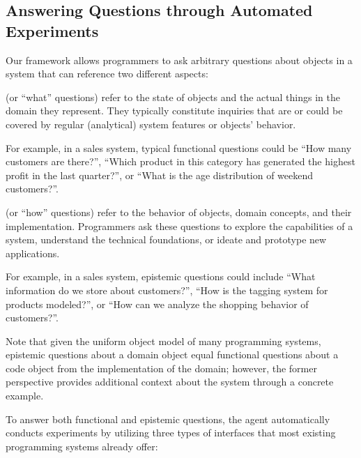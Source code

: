 \subsection*{Answering Questions through Automated Experiments}

Our framework allows programmers to ask arbitrary questions about objects in a system that can reference two different aspects:

\begin{description}[noextralabelsep]
	\item[Functional questions] (or ``what'' questions) refer to the state of objects and the actual things in the domain they represent.
	They typically constitute inquiries that are or could be covered by regular (analytical) system features or objects' behavior.

	For example, in a sales system, typical functional questions could be ``How many customers are there?'', ``Which product in this category has generated the highest profit in the last quarter?'', or ``What is the age distribution of weekend customers?''.

	\item[Epistemic questions] (or ``how'' questions) refer to the behavior of objects, domain concepts, and their implementation.
	Programmers ask these questions to explore the capabilities of a system, understand the technical foundations, or ideate and prototype new applications.

	For example, in a sales system, epistemic questions could include ``What information do we store about customers?'', ``How is the tagging system for products modeled?'', or ``How can we analyze the shopping behavior of customers?''.

	Note that given the uniform object model of many programming systems, epistemic questions about a domain object equal functional questions about a code object from the implementation of the domain; however, the former perspective provides additional context about the system through a concrete example.
\end{description}

To answer both functional and epistemic questions, the agent automatically conducts experiments by utilizing three types of interfaces that most existing programming systems already offer:

